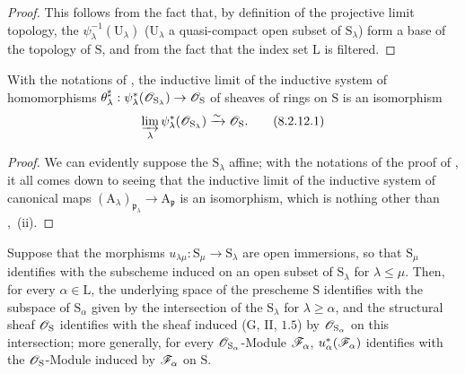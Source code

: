\begin{proof}
This follows from the fact that, by definition of the projective limit topology, the $\psi_\lambda^{-1}(\mathrm{U}_\lambda)$ ($\mathrm{U}_\lambda$ a quasi-compact open subset of $\mathrm{S}_\lambda$) form a base of the topology of $\mathrm{S}$, and from the fact that the index set $\mathrm{L}$ is filtered.
\end{proof}

\begin{corollary}[8.2.12]
\label{IV.8.2.12}
With the notations of , the inductive limit of the inductive system of homomorphisms $\theta_\lambda^\sharp:\psi_\lambda^*(\mathscr{O}_{\mathrm{S}_\lambda})\to\mathscr{O}_\mathrm{S}$ of sheaves of rings on $\mathrm{S}$ is an isomorphism
\begin{equation}
  \varinjlim_\lambda\psi_\lambda^*(\mathscr{O}_{\mathrm{S}_\lambda})\xrightarrow{\sim}\mathscr{O}_\mathrm{S}.
  \label{IV.8.2.12.1}
\tag{8.2.12.1}
\end{equation}
\end{corollary}

\begin{proof}
We can evidently suppose the $\mathrm{S}_\lambda$ affine; with the notations of the proof of , it all comes down to seeing that the inductive limit of the inductive system of canonical maps $(\mathrm{A}_\lambda)_{\mathfrak{p}_\lambda}\to\mathrm{A}_\mathfrak{p}$ is an isomorphism, which is nothing other than ,~(ii).
\end{proof}

\begin{proposition}[8.2.13]
\label{IV.8.2.13}
Suppose that the morphisms $u_{\lambda\mu}:\mathrm{S}_\mu\to\mathrm{S}_\lambda$ are open immersions, so that $\mathrm{S}_\mu$ identifies with the subscheme induced on an open subset of $\mathrm{S}_\lambda$ for $\lambda\leqslant\mu$.
Then, for every $\alpha\in\mathrm{L}$, the underlying space of the prescheme $\mathrm{S}$ identifies with the subspace of $\mathrm{S}_\alpha$ given by the intersection of the $\mathrm{S}_\lambda$ for $\lambda\geqslant\alpha$, and the structural sheaf $\mathscr{O}_\mathrm{S}$ identifies with the sheaf induced \textnormal{(}$\mathrm{G}$, II, $1.5$\textnormal{)} by $\mathscr{O}_{\mathrm{S}_\alpha}$ on this intersection; more generally, for every $\mathscr{O}_{\mathrm{S}_\alpha}$-Module $\mathscr{F}_\alpha$, $u_\alpha^*(\mathscr{F}_\alpha)$ identifies with the $\mathscr{O}_\mathrm{S}$-Module induced by $\mathscr{F}_\alpha$ on $\mathrm{S}$.
\end{proposition}

